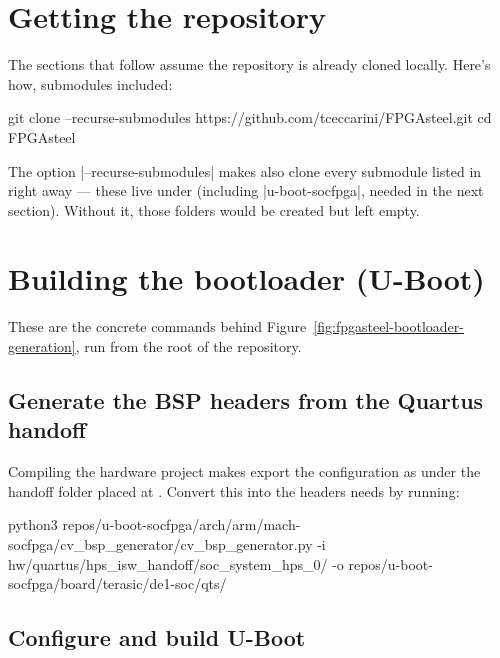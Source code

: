 \section{Getting the repository}
\label{sec:fpgasteel-getting-repository}

The sections that follow assume the  repository is already cloned locally. Here's how, submodules included:

\begin{shellcodehost}
git clone --recurse-submodules https://github.com/tceccarini/FPGAsteel.git
cd FPGAsteel
\end{shellcodehost}

The option |--recurse-submodules| makes  also clone every submodule listed in  right away --- these live under  (including |u-boot-socfpga|, needed in the next section). Without it, those folders would be created but left empty.

\section{Building the bootloader (U-Boot)}
\label{sec:fpgasteel-building-bootloader}

These are the concrete commands behind Figure~\ref{fig:fpgasteel-bootloader-generation}, run from the root of the repository.

\subsection{Generate the BSP headers from the Quartus handoff}
\label{subsec:fpgasteel-bsp-headers}

Compiling the hardware project makes  export the  configuration as  under the handoff folder placed at . Convert this into the  headers  needs by running:

\begin{shellcodehost}
python3 repos/u-boot-socfpga/arch/arm/mach-socfpga/cv_bsp_generator/cv_bsp_generator.py -i hw/quartus/hps_isw_handoff/soc_system_hps_0/ -o repos/u-boot-socfpga/board/terasic/de1-soc/qts/
\end{shellcodehost}

\subsection{Configure and build U-Boot}
\label{subsec:fpgasteel-configure-build-uboot}

